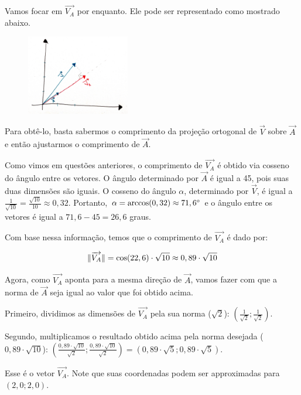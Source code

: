 \documentclass[main.tex]{subfiles}
\begin{document}
Vamos focar em $\overrightarrow{V_A}$ por enquanto. Ele pode ser representado como mostrado abaixo.

\begin{figure}[h]
\centering
\includegraphics[width=0.4\textwidth]{./img/c4r2.jpg}
\end{figure}

Para obtê-lo, basta sabermos o comprimento da projeção ortogonal de $\overrightarrow{V}$ sobre $\overrightarrow{A}$ e então ajustarmos o comprimento de $\overrightarrow{A}$.

Como vimos em questões anteriores, o comprimento de $\overrightarrow{V_A}$ é obtido via cosseno do ângulo entre os vetores. O ângulo determinado por $\overrightarrow{A}$ é igual a 45\degree, pois suas duas dimensões são iguais. O cosseno do ângulo $\alpha$, determinado por $\overrightarrow{V}$, é igual a $\frac{1}{\sqrt{10}}=\frac{\sqrt{10}}{10} \approx 0,32$. Portanto, $\alpha = \arccos(0,32) \approx 71,6\degree$ e o ângulo entre os vetores é igual a $71,6-45=26,6$ graus.

Com base nessa informação, temos que o comprimento de $\overrightarrow{V_A}$ é dado por:

$$
\Arrowvert \overrightarrow{V_A} \Arrowvert = \cos(22,6) \cdot \sqrt{10} \approx 0,89 \cdot \sqrt{10}
$$

Agora, como $\overrightarrow{V_A}$ aponta para a mesma direção de $\overrightarrow{A}$, vamos fazer com que a norma de $\overrightarrow{A}$ seja igual ao valor que foi obtido acima.

Primeiro, dividimos as dimensões de $\overrightarrow{V_A}$ pela sua norma ($\sqrt{2}$): $(\frac{1}{\sqrt{2}};\frac{1}{\sqrt{2}})$.

Segundo, multiplicamos o resultado obtido acima pela norma desejada ($0,89 \cdot \sqrt{10}$): $(\frac{0,89 \cdot \sqrt{10}}{\sqrt{2}};\frac{0,89 \cdot \sqrt{10}}{\sqrt{2}}) = (0,89 \cdot \sqrt{5};0,89 \cdot \sqrt{5})$.

Esse é o vetor $\overrightarrow{V_A}$. Note que suas coordenadas podem ser approximadas para $(2,0;2,0)$.
\end{document}
